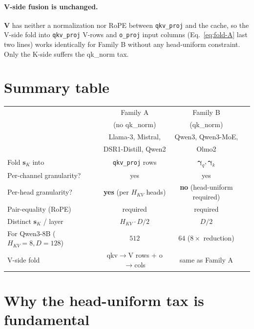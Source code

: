 \documentclass[11pt]{article}
\newcommand{\sk}{\mathbf{s}_K}
\newcommand{\V}{\mathbf{V}}
\begin{document}
\paragraph{V-side fusion is unchanged.} $\V$ has neither a normalization
nor RoPE between \texttt{qkv\_proj} and the cache, so the V-side fold
into \texttt{qkv\_proj} V-rows and \texttt{o\_proj} input columns
(Eq.~\ref{eq:fold-A} last two lines) works identically for Family B
without any head-uniform constraint. Only the K-side suffers the
qk\_norm tax.

\section{Summary table}

\begin{center}
\begin{tabular}{lccc}
\toprule
& Family A & Family B & \\
& (no qk\_norm) & (qk\_norm) & \\
& Llama-3, Mistral, & Qwen3, Qwen3-MoE, & \\
& DSR1-Distill, Qwen2 & Olmo2 & \\
\midrule
Fold $\sk$ into & \texttt{qkv\_proj} rows & $\boldsymbol{\gamma}_q,\boldsymbol{\gamma}_k$ & \\
Per-channel granularity? & yes & yes & \\
Per-head granularity? & \textbf{yes} (per $H_{KV}$ heads) & \textbf{no} (head-uniform required) & \\
Pair-equality (RoPE) & required & required & \\
Distinct $\sk$ / layer & $H_{KV} \cdot D/2$ & $D/2$ & \\
For Qwen3-8B ($H_{KV}=8, D=128$) & $512$ & $64$ ($8\times$ reduction) & \\
V-side fold & qkv$\to$V rows + o$\to$cols & same as Family A & \\
\bottomrule
\end{tabular}
\end{center}

\section{Why the head-uniform tax is fundamental}
\end{document}
